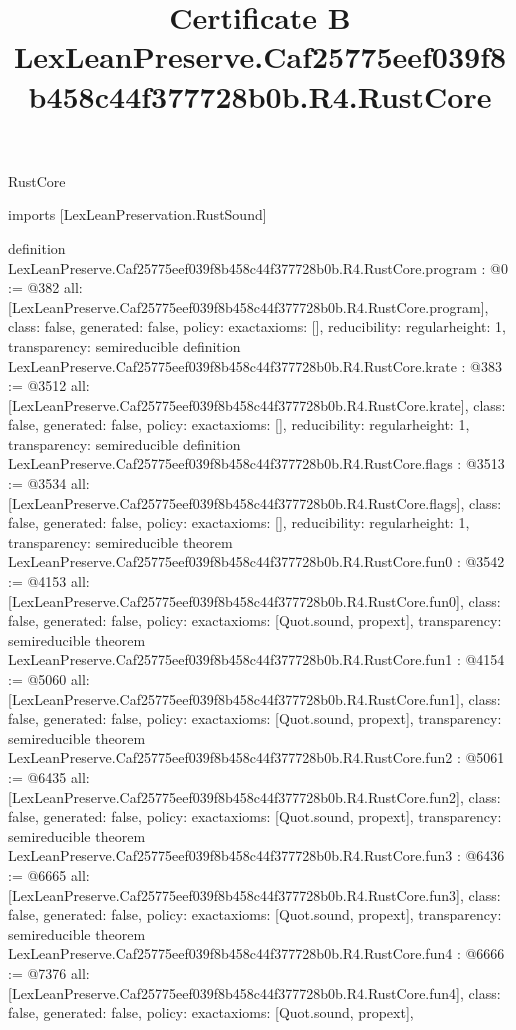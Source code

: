 \begin{lexlean}{RustCore}
\title{Certificate B LexLeanPreserve.Caf25775eef039f8b458c44f377728b0b.R4.RustCore}
\begin{coremodule}
imports [LexLeanPreservation.RustSound]

definition LexLeanPreserve.Caf25775eef039f8b458c44f377728b0b.R4.RustCore.program : @0 := @382 {
  all: [LexLeanPreserve.Caf25775eef039f8b458c44f377728b0b.R4.RustCore.program],
  class: false,
  generated: false,
  policy: exact{axioms: []},
  reducibility: regular{height: 1},
  transparency: semireducible
}
definition LexLeanPreserve.Caf25775eef039f8b458c44f377728b0b.R4.RustCore.krate : @383 := @3512 {
  all: [LexLeanPreserve.Caf25775eef039f8b458c44f377728b0b.R4.RustCore.krate],
  class: false,
  generated: false,
  policy: exact{axioms: []},
  reducibility: regular{height: 1},
  transparency: semireducible
}
definition LexLeanPreserve.Caf25775eef039f8b458c44f377728b0b.R4.RustCore.flags : @3513 := @3534 {
  all: [LexLeanPreserve.Caf25775eef039f8b458c44f377728b0b.R4.RustCore.flags],
  class: false,
  generated: false,
  policy: exact{axioms: []},
  reducibility: regular{height: 1},
  transparency: semireducible
}
theorem LexLeanPreserve.Caf25775eef039f8b458c44f377728b0b.R4.RustCore.fun0 : @3542 := @4153 {
  all: [LexLeanPreserve.Caf25775eef039f8b458c44f377728b0b.R4.RustCore.fun0],
  class: false,
  generated: false,
  policy: exact{axioms: [Quot.sound, propext]},
  transparency: semireducible
}
theorem LexLeanPreserve.Caf25775eef039f8b458c44f377728b0b.R4.RustCore.fun1 : @4154 := @5060 {
  all: [LexLeanPreserve.Caf25775eef039f8b458c44f377728b0b.R4.RustCore.fun1],
  class: false,
  generated: false,
  policy: exact{axioms: [Quot.sound, propext]},
  transparency: semireducible
}
theorem LexLeanPreserve.Caf25775eef039f8b458c44f377728b0b.R4.RustCore.fun2 : @5061 := @6435 {
  all: [LexLeanPreserve.Caf25775eef039f8b458c44f377728b0b.R4.RustCore.fun2],
  class: false,
  generated: false,
  policy: exact{axioms: [Quot.sound, propext]},
  transparency: semireducible
}
theorem LexLeanPreserve.Caf25775eef039f8b458c44f377728b0b.R4.RustCore.fun3 : @6436 := @6665 {
  all: [LexLeanPreserve.Caf25775eef039f8b458c44f377728b0b.R4.RustCore.fun3],
  class: false,
  generated: false,
  policy: exact{axioms: [Quot.sound, propext]},
  transparency: semireducible
}
theorem LexLeanPreserve.Caf25775eef039f8b458c44f377728b0b.R4.RustCore.fun4 : @6666 := @7376 {
  all: [LexLeanPreserve.Caf25775eef039f8b458c44f377728b0b.R4.RustCore.fun4],
  class: false,
  generated: false,
  policy: exact{axioms: [Quot.sound, propext]},
}
\end{coremodule}
\end{lexlean}
